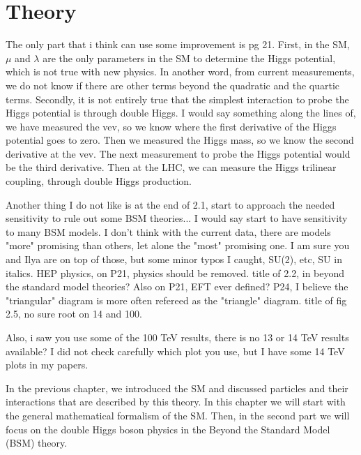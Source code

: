 
\chapter{Theory}
\label{ch:theory}


The only part that i think can use some improvement is pg 21. First, in the SM, $\mu$ and $\lambda$ are the only parameters in the SM to determine the Higgs potential, which is not true with new physics. In another word, from current measurements, we do not know if there are other terms beyond the quadratic and the quartic terms. Secondly, it is not entirely true that the simplest interaction to probe the Higgs potential is through double Higgs. I would say something along the lines of, we have measured the vev, so we know where the first derivative of the Higgs potential goes to zero. Then we measured the Higgs mass, so we know the second derivative at the vev. The next measurement to probe the Higgs potential would be the third derivative. Then at the LHC, we can measure the Higgs trilinear coupling, through double Higgs production.

Another thing I do not like is at the end of 2.1, start to approach the needed sensitivity to rule out some BSM theories... I would say start to have sensitivity to many BSM models. I don't think with the current data, there are models "more" promising than others, let alone the "most" promising one.
I am sure you and Ilya are on top of those, but some minor typos I caught,  
SU(2), etc, SU in italics. 
HEP physics, on P21, physics should be removed.
title of 2.2, in beyond  the standard model theories?
Also on P21, EFT ever defined?
P24, I believe the "triangular" diagram is more often refereed as the "triangle" diagram.
title of fig 2.5, no sure root on 14 and 100.

Also, i saw you use some of the 100 TeV results, there is no 13 or 14 TeV results available? I did not check carefully which plot you use, but I have some 14 TeV plots in my papers.







In the previous chapter, we introduced the SM and discussed particles and their interactions that are described by this theory. In this chapter we will start with the general mathematical formalism of the SM. Then, in the second part we will focus on the double Higgs boson physics in the Beyond the Standard Model (BSM) theory.

